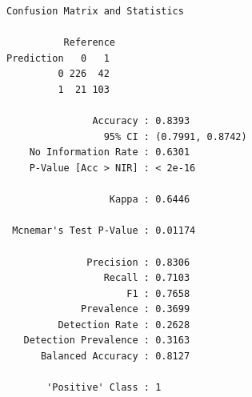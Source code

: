 \documentclass[
  letterpaper,
  DIV=11,
  numbers=noendperiod]{scrartcl}
\begin{document}
\begin{verbatim}
Confusion Matrix and Statistics

          Reference
Prediction   0   1
         0 226  42
         1  21 103
                                          
               Accuracy : 0.8393          
                 95% CI : (0.7991, 0.8742)
    No Information Rate : 0.6301          
    P-Value [Acc > NIR] : < 2e-16         
                                          
                  Kappa : 0.6446          
                                          
 Mcnemar's Test P-Value : 0.01174         
                                          
              Precision : 0.8306          
                 Recall : 0.7103          
                     F1 : 0.7658          
             Prevalence : 0.3699          
         Detection Rate : 0.2628          
   Detection Prevalence : 0.3163          
      Balanced Accuracy : 0.8127          
                                          
       'Positive' Class : 1               
                                          
\end{verbatim}
\end{document}
